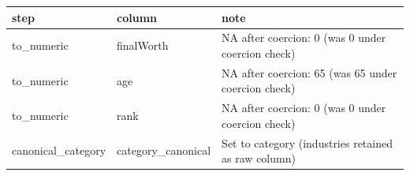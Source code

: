 \begin{tabular}{lll}
\toprule
step & column & note \\
\midrule
to\_numeric & finalWorth & NA after coercion: 0 (was 0 under coercion check) \\
to\_numeric & age & NA after coercion: 65 (was 65 under coercion check) \\
to\_numeric & rank & NA after coercion: 0 (was 0 under coercion check) \\
canonical\_category & category\_canonical & Set to category (industries retained as raw column) \\
\bottomrule
\end{tabular}
